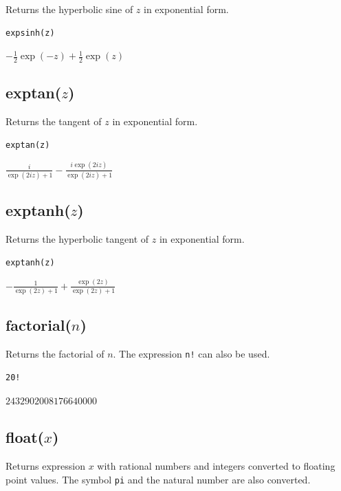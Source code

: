\documentclass[12pt]{article}
\begin{document}
Returns the hyperbolic sine of $z$ in exponential form.

{\color{blue}
\begin{verbatim}
expsinh(z)
\end{verbatim}
}

\noindent
$\displaystyle -\tfrac{1}{2}\exp(-z)+\tfrac{1}{2}\exp(z)$

\subsection*{exptan($z$)}

Returns the tangent of $z$ in exponential form.

{\color{blue}
\begin{verbatim}
exptan(z)
\end{verbatim}
}

\noindent
$\displaystyle \frac{i}{\exp(2iz)+1}-\frac{i\exp(2iz)}{\exp(2iz)+1}$

\subsection*{exptanh($z$)}

Returns the hyperbolic tangent of $z$ in exponential form.

{\color{blue}
\begin{verbatim}
exptanh(z)
\end{verbatim}
}

\noindent
$\displaystyle -\frac{1}{\exp(2z)+1}+\frac{\exp(2z)}{\exp(2z)+1}$

\subsection*{factorial($n$)}

Returns the factorial of $n$.
The expression {\tt n!} can also be used.

{\color{blue}
\begin{verbatim}
20!
\end{verbatim}
}

\noindent
$2432902008176640000$

\subsection*{float($x$)}

Returns expression $x$ with rational numbers and integers converted to
floating point values.
The symbol {\tt pi} and the natural number are also converted.
\end{document}
